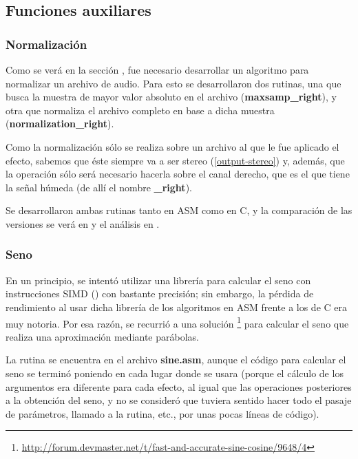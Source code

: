 \subsection{Funciones auxiliares}
\label{subsec:desarrollo-auxiliares}

\subsubsection{Normalización}
\label{subsec:desarrollo-normalizacion}
Como se verá en la sección , fue necesario desarrollar un algoritmo para normalizar un archivo de audio. Para esto se desarrollaron dos rutinas, una que busca la muestra de mayor valor absoluto en el archivo (\textbf{maxsamp\_right}), y otra que normaliza el  archivo completo en base a dicha muestra (\textbf{normalization\_right}).

Como la normalización sólo se realiza sobre un archivo al que le fue aplicado el efecto, sabemos que éste siempre va a ser stereo (\ref{output-stereo}) y, además, que la operación sólo será necesario hacerla sobre el canal derecho, que es el que tiene la señal húmeda (de allí el nombre \textbf{\_right}).

Se desarrollaron ambas rutinas tanto en ASM como en C, y la comparación de las versiones se verá en  y el análisis en .

\subsubsection{Seno}
\label{subsec:desarrollo-seno}
En un principio, se intentó utilizar una librería para calcular el seno con instrucciones SIMD () con bastante precisión; sin embargo, la pérdida de rendimiento al usar dicha librería de los algoritmos en ASM frente a los de C era muy notoria. Por esa razón, se recurrió a una solución \footnote{\url{http://forum.devmaster.net/t/fast-and-accurate-sine-cosine/9648/4}} para calcular el seno que realiza una aproximación mediante parábolas.

La rutina se encuentra en el archivo \textbf{sine.asm}, aunque el código para calcular el seno se terminó poniendo en cada lugar donde se usara (porque el cálculo de los argumentos era diferente para cada efecto, al igual que las operaciones posteriores a la obtención del seno, y no se consideró que tuviera sentido hacer todo el pasaje de parámetros, llamado a la rutina, etc., por unas pocas líneas de código).